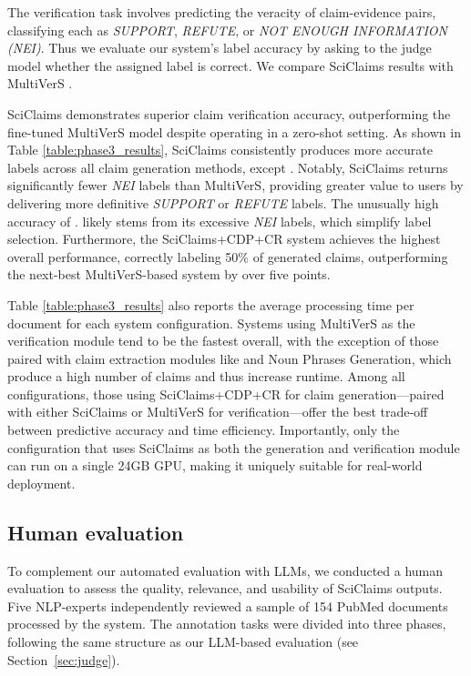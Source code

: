 \documentclass[11pt]{article}
\begin{document}
The verification task involves predicting the veracity of claim-evidence pairs, classifying each as \textit{SUPPORT}, \textit{REFUTE}, or \textit{NOT ENOUGH INFORMATION (NEI)}. Thus we evaluate our system's label accuracy by asking to the judge model whether the assigned label is correct. We compare SciClaims results
with MultiVerS \cite{wadden2022multiversimprovingscientificclaim}.

SciClaims demonstrates superior claim verification accuracy, outperforming the fine-tuned MultiVerS \cite{wadden2022multiversimprovingscientificclaim} model despite operating in a zero-shot setting. As shown in Table \ref{table:phase3_results}, SciClaims consistently produces more accurate labels across all claim generation methods, except \cite{pan-etal-2021-zero}. Notably, SciClaims returns significantly fewer \textit{NEI} labels than MultiVerS, providing greater value to users by delivering more definitive \textit{SUPPORT} or \textit{REFUTE} labels. The unusually high accuracy of \cite{pan-etal-2021-zero}. likely stems from its excessive \textit{NEI} labels, which simplify label selection. Furthermore, the SciClaims+CDP+CR system achieves the highest overall performance, correctly labeling 50\% of generated claims, outperforming the next-best MultiVerS-based system by over five points.

Table \ref{table:phase3_results} also reports the average processing time per document for each system configuration. Systems using MultiVerS as the verification module tend to be the fastest overall, with the exception of those paired with claim extraction modules like \cite{wright-etal-2022-generating} and Noun Phrases Generation, which produce a high number of claims and thus increase runtime. Among all configurations, those using SciClaims+CDP+CR for claim generation—paired with either SciClaims or MultiVerS for verification—offer the best trade-off between predictive accuracy and time efficiency. Importantly, only the configuration that uses SciClaims as both the generation and verification module can run on a single 24GB GPU, making it uniquely suitable for real-world deployment.

\subsection{Human evaluation}
To complement our automated evaluation with LLMs, we conducted a human evaluation to assess the quality, relevance, and usability of SciClaims outputs. Five NLP-experts independently reviewed a sample of 154 PubMed documents processed by the system. The annotation tasks were divided into three phases, following the same structure as our LLM-based evaluation (see Section~\ref{sec:judge}).
\end{document}
